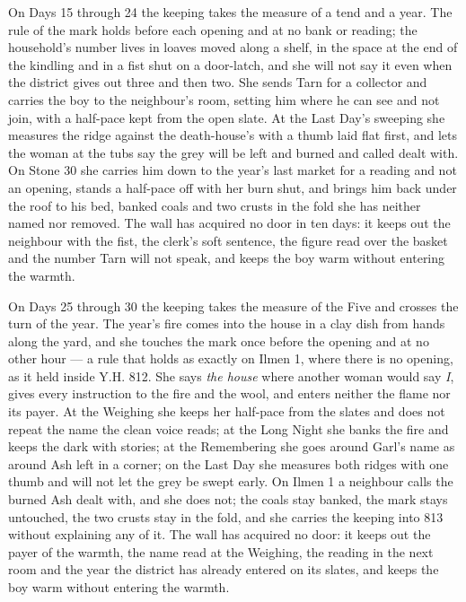 \documentclass{design/chronicle}
\begin{document}
{On Days 15 through 24 the keeping takes the measure of a tend and a year. The rule of the mark holds before each opening and at no bank or reading; the household’s number lives in loaves moved along a shelf, in the space at the end of the kindling and in a fist shut on a door-latch, and she will not say it even when the district gives out three and then two. She sends Tarn for a collector and carries the boy to the neighbour’s room, setting him where he can see and not join, with a half-pace kept from the open slate. At the Last Day’s sweeping she measures the ridge against the death-house’s with a thumb laid flat first, and lets the woman at the tubs say the grey will be left and burned and called dealt with. On Stone 30 she carries him down to the year’s last market for a reading and not an opening, stands a half-pace off with her burn shut, and brings him back under the roof to his bed, banked coals and two crusts in the fold she has neither named nor removed. The wall has acquired no door in ten days: it keeps out the neighbour with the fist, the clerk’s soft sentence, the figure read over the basket and the number Tarn will not speak, and keeps the boy warm without entering the warmth.

On Days 25 through 30 the keeping takes the measure of the Five and crosses the turn of the year. The year’s fire comes into the house in a clay dish from hands along the yard, and she touches the mark once before the opening and at no other hour --- a rule that holds as exactly on Ilmen 1, where there is no opening, as it held inside Y.H. 812. She says \emph{the house} where another woman would say \emph{I}, gives every instruction to the fire and the wool, and enters neither the flame nor its payer. At the Weighing she keeps her half-pace from the slates and does not repeat the name the clean voice reads; at the Long Night she banks the fire and keeps the dark with stories; at the Remembering she goes around Garl’s name as around Ash left in a corner; on the Last Day she measures both ridges with one thumb and will not let the grey be swept early. On Ilmen 1 a neighbour calls the burned Ash dealt with, and she does not; the coals stay banked, the mark stays untouched, the two crusts stay in the fold, and she carries the keeping into 813 without explaining any of it. The wall has acquired no door: it keeps out the payer of the warmth, the name read at the Weighing, the reading in the next room and the year the district has already entered on its slates, and keeps the boy warm without entering the warmth.

}
\end{document}
